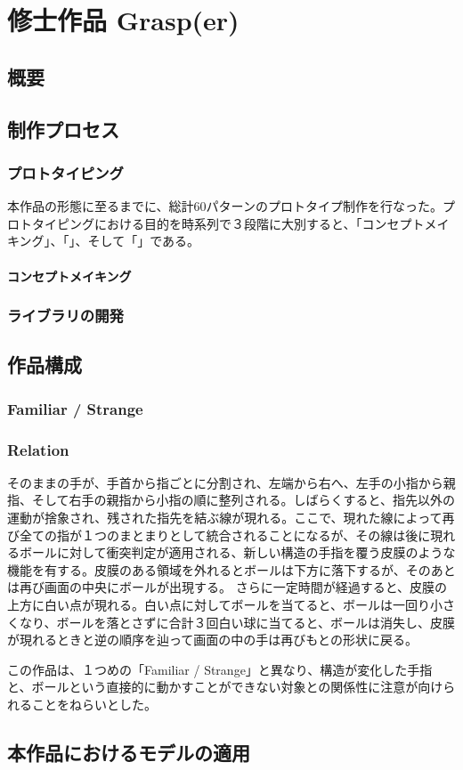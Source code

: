 \chapter{修士作品 Grasp(er)}
\section{概要}
\section{制作プロセス}
\subsection{プロトタイピング}
本作品の形態に至るまでに、総計60パターンのプロトタイプ制作を行なった。プロトタイピングにおける目的を時系列で３段階に大別すると、「コンセプトメイキング」、「」、そして「」である。
\subsubsection{コンセプトメイキング}
\subsection{ライブラリの開発}
\section{作品構成}
\subsection{Familiar / Strange}

\subsection{Relation}
そのままの手が、手首から指ごとに分割され、左端から右へ、左手の小指から親指、そして右手の親指から小指の順に整列される。しばらくすると、指先以外の運動が捨象され、残された指先を結ぶ線が現れる。ここで、現れた線によって再び全ての指が１つのまとまりとして統合されることになるが、その線は後に現れるボールに対して衝突判定が適用される、新しい構造の手指を覆う皮膜のような機能を有する。皮膜のある領域を外れるとボールは下方に落下するが、そのあとは再び画面の中央にボールが出現する。
さらに一定時間が経過すると、皮膜の上方に白い点が現れる。白い点に対してボールを当てると、ボールは一回り小さくなり、ボールを落とさずに合計３回白い球に当てると、ボールは消失し、皮膜が現れるときと逆の順序を辿って画面の中の手は再びもとの形状に戻る。

この作品は、１つめの「Familiar / Strange」と異なり、構造が変化した手指と、ボールという直接的に動かすことができない対象との関係性に注意が向けられることをねらいとした。
\section{本作品におけるモデルの適用}